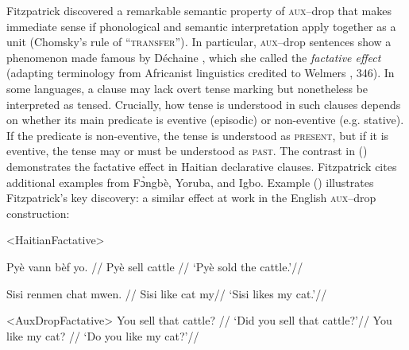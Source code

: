 \documentclass[output=paper]{langscibook}
\begin{document}
Fitzpatrick discovered a remarkable semantic property of \textsc{aux}--drop that makes immediate sense if phonological and semantic interpretation apply together as a unit (Chomsky's \citeyear{Chomsky2001a} rule of ``\textsc{transfer}'')\textit{.} In particular, \textsc{aux}--drop sentences show a phenomenon made famous by Déchaine \citeyearpar{Dechaine1991}, which she called the \textit{factative effect} (adapting terminology from Africanist linguistics credited to Welmers \citeyear{Welmers:1973aa}, 346). In some languages, a clause may lack overt tense marking but nonetheless be interpreted as tensed. Crucially, how tense is understood in such clauses depends on whether its main predicate is eventive (episodic) or non-eventive (e.g. stative). If the predicate is non-eventive, the tense is understood as \textsc{present}, but if it is eventive, the tense may or must be understood as \textsc{past}. The contrast in () demonstrates the factative effect in Haitian declarative clauses. Fitzpatrick cites additional examples from Fɔ̀ngbè, Yoruba, and Igbo. Example (\noindent {}) illustrates Fitzpatrick's key discovery: a similar effect at work in the English \textsc{aux}--drop construction:

\pex<HaitianFactative>

\a
\begingl
\gla Pyè vann bèf yo.  {}//
\glb Pyè sell cattle \Det{}//
\glft `Pyè sold the cattle.'//
\endgl

\a
 \begingl
\gla Sisi renmen chat mwen. {}//
\glb Sisi like cat my//
\glft `Sisi likes my cat.'//
\endgl
\xe

\pex[aboveexskip=0pt]
<AuxDropFactative>
\a
\begingl
\gla You sell that cattle? {}//
\glft `Did you sell that cattle?'//
\endgl
\a
\begingl
\gla You like my cat? {}//
\glft `Do you like my cat?'//
\endgl
\xe
\end{document}
